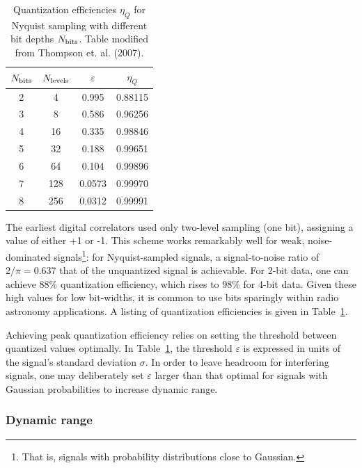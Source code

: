 \documentclass{ws-rv961x669}
\begin{document}
\begin{table}
	\caption{Quantization efficiencies $\eta_Q$ for Nyquist sampling with different bit depths $N_{\rm{bits}}$. Table modified from Thompson et. al. (2007)\citep{Thompson:2007p8886}.\label{tab:quant_eff}}
	\begin{center}
	\begin{tabular}{c c c c}
	\hline
	$N_{\rm{bits}}$ & $N_{\rm{levels}}$ & $\varepsilon$ & $\eta_Q$ \\
	\hline
	\hline
	2 & 4   & 0.995  & 0.88115 \\
	3 & 8   & 0.586  & 0.96256 \\
	4 & 16  & 0.335  & 0.98846 \\
	5 & 32  & 0.188  & 0.99651 \\
	6 & 64  & 0.104  & 0.99896 \\
	7 & 128 & 0.0573 & 0.99970 \\
	8 & 256 & 0.0312 & 0.99991 \\
	\hline
	\end{tabular}
	\end{center}
\end{table}

The earliest digital correlators \citep{Weinreb:1963p10042} used only two-level sampling (one bit), assigning a value of either +1 or -1. This scheme works remarkably well for weak, noise-dominated signals\footnote{That is, signals with probability distributions close to Gaussian.}: for Nyquist-sampled signals, a signal-to-noise ratio of $2/\pi=0.637$ that of the unquantized signal is achievable\citet{ThompsonMoranSwenson2004}. For 2-bit data, one can achieve 88\% quantization efficiency, which rises to 98\% for 4-bit data. Given these high values for low bit-widths, it is common to use bits sparingly within radio astronomy applications. A listing of quantization efficiencies\cite{Thompson:2007p8886} is given in Table~\ref{tab:quant_eff}.


Achieving peak quantization efficiency relies on setting the threshold between quantized values optimally. In Table~\ref{tab:quant_eff}, the threshold $\varepsilon$ is expressed in units of the signal's standard deviation $\sigma$. In order to leave headroom for interfering signals, one may deliberately set $\varepsilon$ larger than that optimal for signals with Gaussian probabilities to increase dynamic range.


\subsubsection{Dynamic range\label{sub:dynamic-range}}
\end{document}
